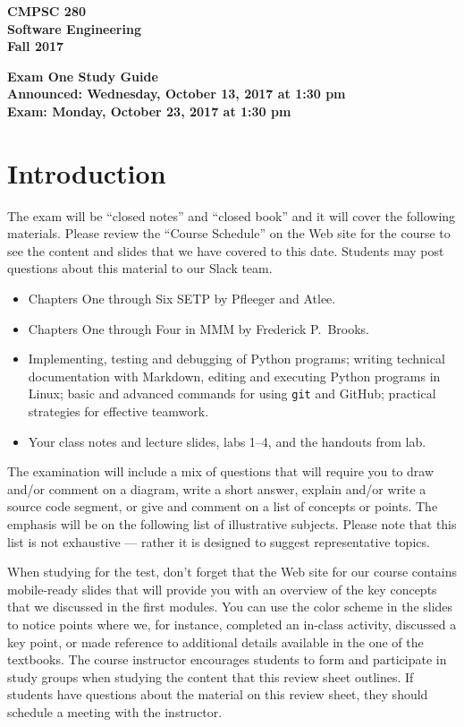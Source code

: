 \documentclass[11pt]{article}
\newcommand{\assignmentduedate}{October 23}
\newcommand{\assignmentassignedate}{October 13}
\newcommand{\assignmentnumber}{One}
\newcommand{\labyear}{2017}
\newcommand{\assignedday}{Wednesday}
\newcommand{\dueday}{Monday}
\newcommand{\labtime}{1:30 pm}
\newcommand{\assigneddate}{Announced: \assignedday, \assignmentassignedate, \labyear{} at \labtime{}}
\newcommand{\duedate}{Exam: \dueday, \assignmentduedate, \labyear{} at \labtime{}}
\newcommand{\guidetitle}[1]
{
  \begin{center}
    \begin{center}
      \bf
      CMPSC 280\\Software Engineering\\
      Fall 2017\\
      \medskip
    \end{center}
    \bf
    #1
  \end{center}
}
\begin{document}
\thispagestyle{empty}

\guidetitle{Exam \assignmentnumber{} Study Guide \\ \assigneddate{} \\ \duedate{}}

\section*{Introduction}

\noindent
The exam will be ``closed notes'' and ``closed book'' and it will cover the
following materials. Please review the ``Course Schedule'' on the Web site for
the course to see the content and slides that we have covered to this date.
Students may post questions about this material to our Slack team.

\begin{itemize}

  \itemsep 0in

  \item Chapters One through Six SETP by Pfleeger and Atlee.

  \item Chapters One through Four in MMM by Frederick P.\ Brooks.

  \item Implementing, testing and debugging of Python programs; writing
    technical documentation with Markdown, editing and executing Python programs
    in Linux; basic and advanced commands for using {\tt git} and GitHub;
    practical strategies for effective teamwork.

  \item Your class notes and lecture slides, labs 1--4, and the handouts from
    lab.

\end{itemize}

\noindent The examination will include a mix of questions that will require you
to draw and/or comment on a diagram, write a short answer, explain and/or write
a source code segment, or give and comment on a list of concepts or points. The
emphasis will be on the following list of illustrative subjects. Please note
that this list is not exhaustive --- rather it is designed to suggest
representative topics.

When studying for the test, don't forget that the Web site for our course
contains mobile-ready slides that will provide you with an overview of the key
concepts that we discussed in the first modules. You can use the color scheme in
the slides to notice points where we, for instance, completed an in-class
activity, discussed a key point, or made reference to additional details
available in the one of the textbooks. The course instructor encourages students
to form and participate in study groups when studying the content that this
review sheet outlines. If students have questions about the material on this
review sheet, they should schedule a meeting with the instructor.
\end{document}

